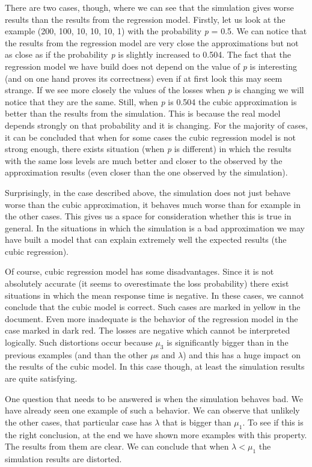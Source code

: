 \documentclass[12pt]{article}
\theoremstyle{plain}
\begin{document}
There are two cases, though, where we can see that the simulation gives worse
results than the results from the regression model. Firstly, let us look at the
example (200, 100, 10, 10, 10, 1) with the probability \emph{p} = 0.5. We can notice
that the results from the regression model are very close the approximations but not as
close as if the probability \emph{p} is slightly increased to 0.504. The fact
that the regression model we have build does not depend on the value of
\emph{p} is interesting (and on one hand proves its correctness) even if at
first look this may seem strange. If we see more closely the values of the
losses when \emph{p} is changing we will notice that they are the
same. Still, when \emph{p} is 0.504 the cubic approximation is better than the
results from the simulation.  This is because the real model depends strongly
on that probability and it is changing. For the majority of cases, it can be
concluded that when for some cases the cubic regression model is not strong
enough, there exists situation (when \emph{p} is different) in which the results
with the same loss levels are much better and closer to the observed by the approximation results
(even closer than the one observed by the simulation).

Surprisingly, in the case described above, the simulation does not just behave
worse than the cubic approximation, it behaves much worse than for example in
the other cases. This gives us a space for consideration whether this is true in
general. In the situations in which the simulation is a bad approximation we
may have built a model that can explain extremely well the expected results (the cubic regression).

Of course, cubic regression model has some disadvantages. Since it is not
absolutely accurate (it seems to overestimate the loss probability) there exist
situations in which the mean response time is negative. In these cases, we
cannot conclude that the cubic model is correct. Such cases are marked in
yellow in the document. Even more inadequate is the behavior of the regression
model in the case marked in dark red. The losses are negative which
cannot be interpreted logically.  Such distortions occur because $\mu_3$ is
significantly bigger than in the previous examples (and than the other $\mu$s
and $\lambda$) and this has a huge impact on the results of the cubic model. In
this case though, at least the simulation results are quite satisfying.

One question that needs to be answered is when the simulation behaves bad.
We have already seen one example of such a behavior. We can observe that
unlikely the other cases, that particular case has $\lambda$ that is bigger than
$\mu_1$. To see if this is the right conclusion, at the end we have shown more
examples with this property. The results from them are clear. We can conclude
that when $\lambda < \mu_1$ the simulation results are distorted.
\end{document}
